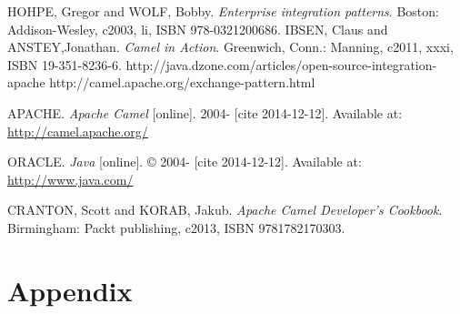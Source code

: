\documentclass[12pt,final,oneside]{fithesis2}
\begin{document}
\begin{thebibliography}{}
 HOHPE, Gregor and WOLF, Bobby. \textit{Enterprise integration patterns}. Boston: Addison-Wesley, c2003, li, ISBN 978-0321200686.
 IBSEN, Claus and ANSTEY,Jonathan. \textit{Camel in Action}. Greenwich, Conn.: Manning, c2011, xxxi, ISBN 19-351-8236-6.
 http://java.dzone.com/articles/open-source-integration-apache
 http://camel.apache.org/exchange-pattern.html

 APACHE. \textit{Apache Camel} [online]. 2004- [cite 2014-12-12]. Available at: \url{http://camel.apache.org/}

 ORACLE. \textit{Java} [online]. \copyright{} 2004- [cite 2014-12-12]. Available at: \url{http://www.java.com/}			

%
 CRANTON, Scott and KORAB, Jakub. \textit{Apache Camel Developer's Cookbook}.  Birmingham: Packt publishing, c2013, ISBN 9781782170303.
%
%




\end{thebibliography}

\endgroup
\appendix

\chapter{Appendix}


\end{document}
